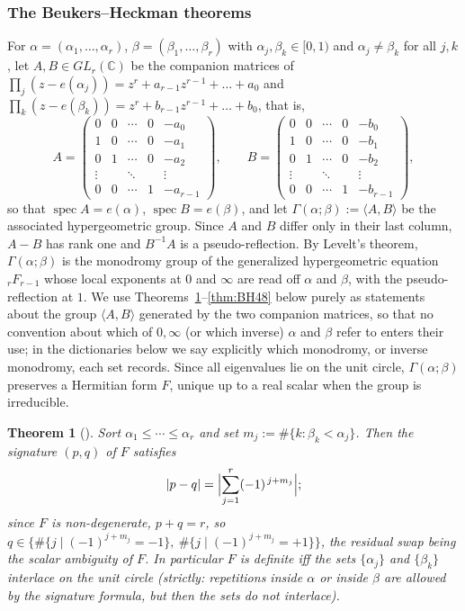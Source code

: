 \documentclass[11pt]{article}
\newtheorem{theorem}{Theorem}[section]
\theoremstyle{definition}
\newcommand{\C}{\mathbb C}
\begin{document}
\subsubsection{The Beukers--Heckman theorems}
For $\alpha=(\alpha_1,\dots,\alpha_r)$, $\beta=(\beta_1,\dots,\beta_r)$ with
$\alpha_j,\beta_k\in[0,1)$ and $\alpha_j\neq\beta_k$ for all $j,k$, let
$A,B\in GL_r(\C)$ be the companion matrices of
$\prod_j(z-e(\alpha_j))=z^{r}+a_{r-1}z^{r-1}+\dots+a_0$ and
$\prod_k(z-e(\beta_k))=z^{r}+b_{r-1}z^{r-1}+\dots+b_0$, that is,
\[
A=\begin{pmatrix}
0&0&\cdots&0&-a_0\\
1&0&\cdots&0&-a_1\\
0&1&\cdots&0&-a_2\\
\vdots&&\ddots&&\vdots\\
0&0&\cdots&1&-a_{r-1}
\end{pmatrix},
\qquad
B=\begin{pmatrix}
0&0&\cdots&0&-b_0\\
1&0&\cdots&0&-b_1\\
0&1&\cdots&0&-b_2\\
\vdots&&\ddots&&\vdots\\
0&0&\cdots&1&-b_{r-1}
\end{pmatrix},
\]
so that $\operatorname{spec}A=e(\alpha)$, $\operatorname{spec}B=e(\beta)$,
and let $\Gamma(\alpha;\beta):=\langle A,B\rangle$ be the associated
hypergeometric group. Since $A$ and $B$ differ only in their last
column, $A-B$ has rank one and $B^{-1}A$ is a pseudo-reflection. By
Levelt's theorem, $\Gamma(\alpha;\beta)$ is the monodromy group of
the generalized hypergeometric equation ${}_rF_{r-1}$ whose local
exponents at $0$ and $\infty$ are read off $\alpha$ and $\beta$,
with the pseudo-reflection at $1$. We use
Theorems~\ref{thm:BH45}--\ref{thm:BH48} below purely as statements
about the group $\langle A,B\rangle$ generated by the two companion
matrices, so that no convention about which of $0,\infty$ (or which
inverse) $\alpha$ and $\beta$ refer to enters their use; in the
dictionaries below we say explicitly which monodromy, or inverse
monodromy, each set records. Since all eigenvalues lie on the unit
circle, $\Gamma(\alpha;\beta)$ preserves a Hermitian form $F$, unique up to a
real scalar when the group is irreducible.

\begin{theorem}[{\cite[Thm.~4.5 and Cor.~4.7]{BH}}]\label{thm:BH45}
Sort $\alpha_1\le\cdots\le\alpha_r$ and set
$m_j:=\#\{k:\beta_k<\alpha_j\}$. Then the signature $(p,q)$ of $F$ satisfies
\[
|p-q|=\Bigl|\sum_{j=1}^{r}(-1)^{\,j+m_j}\Bigr| ;
\]
since $F$ is non-degenerate, $p+q=r$, so
$q\in\bigl\{\#\{j\mid(-1)^{j+m_j}=-1\},\ \#\{j\mid(-1)^{j+m_j}=+1\}\bigr\}$,
the residual swap being the scalar ambiguity of $F$. In particular $F$ is
definite iff the sets $\{\alpha_j\}$ and $\{\beta_k\}$ interlace on the unit
circle (strictly: repetitions inside $\alpha$ or inside $\beta$ are allowed
by the signature formula, but then the sets do not interlace).
\end{theorem}
\end{document}
